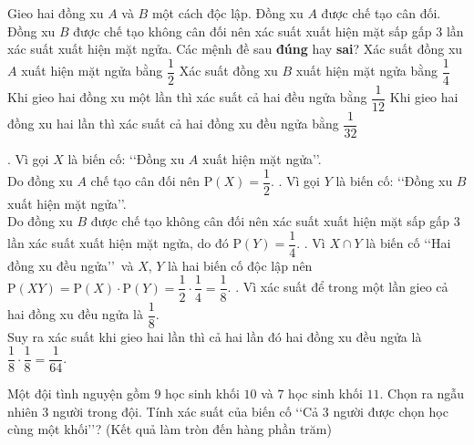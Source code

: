 \begin{ex}%
	Gieo hai đồng xu $A$ và $B$ một cách độc lập. Đồng xu $A$ được chế tạo cân đối. Đồng xu $B$ được chế tạo không cân đối nên xác suất xuất hiện mặt sấp gấp $3$ lần xác suất xuất hiện mặt ngửa. Các mệnh đề sau \textbf{đúng }hay \textbf{sai}?
	\choiceTF
	{\True Xác suất đồng xu $A$ xuất hiện mặt ngửa bằng $\dfrac{1}{2}$}
	{\True Xác suất đồng xu $B$ xuất hiện mặt ngửa bằng $\dfrac{1}{4}$}
	{Khi gieo hai đồng xu một lần thì xác suất cả hai đều ngửa bằng $\dfrac{1}{12}$}
	{Khi gieo hai đồng xu hai lần thì xác suất cả hai đồng xu đều ngửa bằng $\dfrac{1}{32}$}
	\loigiai
	{
		\begin{itemchoice}
			. Vì gọi $X$ là biến cố: \lq\lq Đồng xu $A$ xuất hiện mặt ngửa\rq\rq.\\
			Do đồng xu $A$ chế tạo cân đối nên $\mathrm{P}(X)=\dfrac{1}{2}$.
			. Vì gọi $Y$ là biến cố: \lq\lq Đồng xu $B$ xuất hiện mặt ngửa\rq\rq.\\
			Do đồng xu $B$ được chế tạo không cân đối nên xác suất xuất hiện mặt sấp gấp $3$ lần xác suất xuất hiện mặt ngửa, do đó $\mathrm{P}(Y)=\dfrac{1}{4}$.
			. Vì $X\cap Y$ là biến cố \lq\lq Hai đồng xu đều ngửa\rq\rq\ và $X$, $Y$ là hai biến cố độc lập nên $\mathrm{P}(XY)=\mathrm{P}(X)\cdot\mathrm{P}(Y)=\dfrac{1}{2}\cdot\dfrac{1}{4}=\dfrac{1}{8}$.
			. Vì xác suất để trong một lần gieo cả hai đồng xu đều ngửa là $\dfrac{1}{8}$.\\
			Suy ra xác suất khi gieo hai lần thì cả hai lần đó hai đồng xu đều ngửa là $\dfrac{1}{8}\cdot\dfrac{1}{8}=\dfrac{1}{64}$.
		\end{itemchoice}
	}
\end{ex}

\begin{ex}%
	Một đội tình nguyện gồm $9$ học sinh khối $10$ và $7$ học sinh khối $11$. Chọn ra ngẫu nhiên $3$ người trong đội. Tính xác suất của biến cố  \lq\lq Cả $3$ người được chọn học cùng một khối\rq\rq? (Kết quả làm tròn đến hàng phần trăm)
\end{ex}

